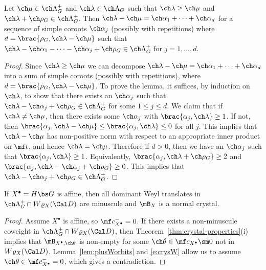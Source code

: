 \begin{lem}
\notready  \label{lem:walls}
Let $\ch\mu \in \ch\Lambda_G^+$ and $\ch\lambda \in \ch\Lambda_G$
such that $\ch\lambda \ge \ch\mu$ and $\ch\lambda+\ch\rho_G \in \ch\Lambda^+_G$.
Then $\ch\lambda-\ch\mu = \ch\alpha_1+\dotsb + \ch\alpha_d$ for a
sequence of simple coroots $\ch\alpha_j$ (possibly with repetitions)
where $d = \brac{\rho_G, \ch\lambda-\ch\mu}$
such that $\ch\lambda - \ch\alpha_1 - \dotsb - \ch\alpha_j + \ch\rho_G
\in \ch\Lambda^+_G$ for $j=1,\dotsc,d$.
\end{lem}
\begin{proof}
Since $\ch\lambda\ge\ch\mu$ we can decompose
$\ch\lambda-\ch\mu = \ch\alpha_1+\dotsb+\ch\alpha_d$ into a sum of simple coroots (possibly with repetitions),
where $d = \brac{\rho_G,\ch\lambda-\ch\mu}$.
To prove the lemma, it suffices, by induction on $\ch\lambda$, to
show that there exists an $\ch\alpha_j$ such that
$\ch\lambda-\ch\alpha_j + \ch\rho_G \in \ch\Lambda^+_G$ for some
$1\le j\le d$.
We claim that if $\ch\lambda \ne \ch\mu$, then there exists some $\ch\alpha_j$
with $\brac{\alpha_j, \ch\lambda} \ge 1$.
If not, then $\brac{\alpha_j,\ch\lambda-\ch\mu} \le \brac{\alpha_j, \ch\lambda} \le 0$ for all $j$. This implies that $\ch\lambda-\ch\mu$
has non-positive norm with respect to an appropriate inner product on
$\mf t$, and hence $\ch\lambda=\ch\mu$.
Therefore if $d>0$, then we have an $\ch\alpha_j$
such that $\brac{\alpha_j, \ch\lambda} \ge 1$.
Equivalently, $\brac{\alpha_j, \ch\lambda+\ch\rho_G} \ge 2$
and $\brac{\alpha_j, \ch\lambda-\ch\alpha_j+\ch\rho_G} \ge 0$.
This implies that $\ch\lambda-\ch\alpha_j +\ch\rho_G \in \ch\Lambda^+_G$.
\end{proof}



\begin{cor}
\notready \label{cor:Hreductive}
If $X^\bullet = H\bs G$ is affine, then all dominant Weyl translates
in $\ch\Lambda^+_G\cap W\varrho_X(\Cal D)$ are minuscule
and $\mB_X$ is a normal crystal.
\end{cor}
\begin{proof}
Assume $X^\bullet$ is affine, so $\mf c_{X^\bullet}^- = 0$.
If there exists a non-minuscule coweight in $\ch\Lambda^+_G \cap W\varrho_X(\Cal D)$, then
Theorem~\ref{thm:crystal-properties}(i) implies that $\mB_{X^\bullet, \ch\theta}$ is non-empty
for some $\ch\theta \in \mf c_{X^\bullet}\sm 0$ not in $W\varrho_X(\Cal D)$.
Lemma~\ref{lem:plusWorbits} and \eqref{e:crysW} allow us to assume $\ch\theta \in \mf c_{X^\bullet}^- = 0$,
which gives a contradiction.
\end{proof}

